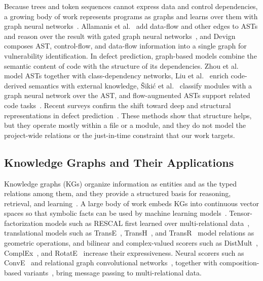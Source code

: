 \documentclass[final,5p,times,twocolumn]{elsarticle}
\theoremstyle{plain}
\begin{document}
Because trees and token sequences cannot express data and control dependencies, a growing body of work represents programs as graphs and learns over them with graph neural networks~\cite{scarselli2009graph,wu2021comprehensive}. Allamanis et al.~\cite{allamanis2018learning} add data-flow and other edges to ASTs and reason over the result with gated graph neural networks~\cite{li2016gated}, and Devign~\cite{zhou2019devign} composes AST, control-flow, and data-flow information into a single graph for vulnerability identification. In defect prediction, graph-based models combine the semantic content of code with the structure of its dependencies. Zhou et al.~\cite{zhou2022software} model ASTs
together with class-dependency networks, Liu et al.~\cite{liu2023semantic} enrich code-derived semantics with external knowledge, \v{S}iki\'{c} et al.~\cite{sikic2022graph} classify modules with a graph neural network over the AST, and flow-augmented ASTs support related code tasks~\cite{wang2020detecting}. Recent surveys confirm the shift toward deep and structural representations in defect prediction~\cite{zain2023application}. These methods show that structure helps, but they operate mostly within a file or a module, and they do not model the project-wide relations or the just-in-time constraint that our work targets.

\subsection{Knowledge Graphs and Their Applications}
\label{subsec:kg}

Knowledge graphs (KGs) organize information as entities and as the typed relations among them, and they provide a structured basis for reasoning, retrieval, and learning~\cite{hogan2021knowledge,ji2022survey,nickel2016review}. A large body of work embeds KGs into continuous vector spaces so that symbolic facts can be used by machine learning models~\cite{ji2022survey,wang2017knowledge}. Tensor-factorization models such as RESCAL first learned over multi-relational data~\cite{nickel2011three}, translational models such as TransE~\cite{bordes2013translating}, TransH~\cite{wang2014knowledge}, and TransR~\cite{lin2015learning} model relations as geometric operations, and bilinear and complex-valued scorers such as DistMult~\cite{yang2015embedding}, ComplEx~\cite{trouillon2016complex}, and RotatE~\cite{sun2019rotate} increase their expressiveness. Neural scorers such as ConvE~\cite{dettmers2018convolutional} and relational graph convolutional networks~\cite{schlichtkrull2018modeling}, together with composition-based variants~\cite{vashishth2020composition}, bring message passing to multi-relational data.
\end{document}
